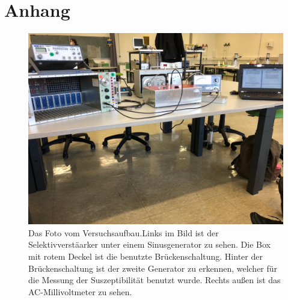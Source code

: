 \section{Anhang}
\label{sec:Anhang}
\begin{figure}
    \centering
    \includegraphics[width=\textwidth]{content/index.jpeg}
    \caption{Das Foto vom Versuchsaufbau.Links im Bild ist der Selektivverstäarker unter einem Sinusgenerator zu sehen. 
    Die Box mit rotem Deckel ist die benutzte Brückenschaltung. 
    Hinter der Brückenschaltung ist der zweite Generator zu erkennen, welcher für die Messung der Suszeptibilität benutzt wurde.
    Rechts außen ist das AC-Millivoltmeter zu sehen.}
    \label{fig:datenselektiv}
\end{figure}
